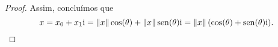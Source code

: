 \begin{proof}
Assim, concluímos que
	\begin{equation*}
	x = x_0 + x_1 \mathrm{i} = \left\Vert{x}\right\Vert\cos(\theta) + \left\Vert{x}\right\Vert\operatorname{sen}(\theta) \mathrm{i} = \left\Vert{x}\right\Vert(\cos(\theta) + \operatorname{sen}(\theta) \mathrm{i}).
	\end{equation*}
\end{proof}


\begin{comment}

\begin{figure}
\centering
\begin{tikzpicture}[scale=2]
	\draw (-1,0) node[anchor=north] {$-1$} -- (0,0) node[anchor=north] {$0$} -- (1,0) node[anchor=north] {$1$};
	\draw (0,0) -- (0,pi/2) node[anchor=west] {$\displaystyle\frac{\tau}{4}$} -- (0,pi) node[anchor=west] {$\displaystyle\frac{\tau}{2}$};
	\draw[dotted] (1,0) -- (1,pi) -- (-1,pi) -- (-1,0);
	\draw plot [domain=0:pi,smooth] ({cos(\x r)},\x);
\end{tikzpicture}
\caption{Gráfico da função $\cos\inv\colon \intff{-1}{1} \to \intff{0}{\frac{\tau}{2}}$.}
\end{figure}

\begin{figure}
\centering
\begin{tikzpicture}[scale=2]
	\draw (-1,0) node[anchor=east] {$-1$} -- (0,0) node[anchor=east] {$0$} -- (1,0) node[anchor=west] {$1$};
	\draw (0,-pi/2) node[anchor=east] {$-\displaystyle\frac{\tau}{4}$} -- (0,pi/2) node[anchor=east] {$\displaystyle\frac{\tau}{4}$};
	\draw[dotted] (-1,-pi/2) rectangle (1,pi/2);
	\draw plot [domain=-pi/2:pi/2,smooth] ({sin(\x r)},\x);
\end{tikzpicture}
\caption{Gráfico da função $\sin\inv\colon \intff{-1}{1} \to \intff{-\frac{\tau}{4}}{\frac{\tau}{4}}$.}
\label{fig:senoinv}
\end{figure}


\begin{figure}
\centering
\begin{tikzpicture}[scale=1]
	\draw plot [domain=-1:1,smooth] (\x,{tan(\x r));
\end{tikzpicture}
\caption{Gráfico da função $\tan\inv\colon \R \to \intaa{\frac{\tau}{2}}{\frac{\tau}{2}}$.}
\end{figure}

\end{comment}

